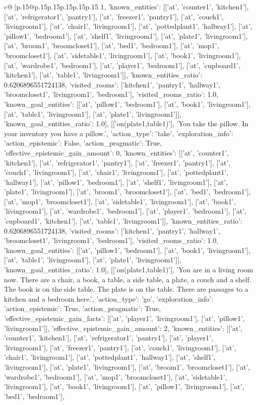 \documentclass{article}
\begin{document}
{\begin{supertabular}{c@{$\;$}|p{.15\linewidth}@{}p{.15\linewidth}p{.15\linewidth}p{.15\linewidth}p{.15\linewidth}p{.15\linewidth}}
{{{1, 'known_entities': [['at', 'counter1', 'kitchen1'], ['at', 'refrigerator1', 'pantry1'], ['at', 'freezer1', 'pantry1'], ['at', 'couch1', 'livingroom1'], ['at', 'chair1', 'livingroom1'], ['at', 'pottedplant1', 'hallway1'], ['at', 'pillow1', 'bedroom1'], ['at', 'shelf1', 'livingroom1'], ['at', 'plate1', 'livingroom1'], ['at', 'broom1', 'broomcloset1'], ['at', 'bed1', 'bedroom1'], ['at', 'mop1', 'broomcloset1'], ['at', 'sidetable1', 'livingroom1'], ['at', 'book1', 'livingroom1'], ['at', 'wardrobe1', 'bedroom1'], ['at', 'player1', 'bedroom1'], ['at', 'cupboard1', 'kitchen1'], ['at', 'table1', 'livingroom1']], 'known_entities_ratio': 0.6206896551724138, 'visited_rooms': ['kitchen1', 'pantry1', 'hallway1', 'broomcloset1', 'livingroom1', 'bedroom1'], 'visited_rooms_ratio': 1.0, 'known_goal_entities': [['at', 'pillow1', 'bedroom1'], ['at', 'book1', 'livingroom1'], ['at', 'table1', 'livingroom1'], ['at', 'plate1', 'livingroom1']], 'known_goal_entities_ratio': 1.0}}], [['on(plate1,table1)'], 'You take the pillow. In your inventory you have a pillow.', {'action_type': 'take', 'exploration_info': {'action_epistemic': False, 'action_pragmatic': True, 'effective_epistemic_gain_amount': 0, 'known_entities': [['at', 'counter1', 'kitchen1'], ['at', 'refrigerator1', 'pantry1'], ['at', 'freezer1', 'pantry1'], ['at', 'couch1', 'livingroom1'], ['at', 'chair1', 'livingroom1'], ['at', 'pottedplant1', 'hallway1'], ['at', 'pillow1', 'bedroom1'], ['at', 'shelf1', 'livingroom1'], ['at', 'plate1', 'livingroom1'], ['at', 'broom1', 'broomcloset1'], ['at', 'bed1', 'bedroom1'], ['at', 'mop1', 'broomcloset1'], ['at', 'sidetable1', 'livingroom1'], ['at', 'book1', 'livingroom1'], ['at', 'wardrobe1', 'bedroom1'], ['at', 'player1', 'bedroom1'], ['at', 'cupboard1', 'kitchen1'], ['at', 'table1', 'livingroom1']], 'known_entities_ratio': 0.6206896551724138, 'visited_rooms': ['kitchen1', 'pantry1', 'hallway1', 'broomcloset1', 'livingroom1', 'bedroom1'], 'visited_rooms_ratio': 1.0, 'known_goal_entities': [['at', 'pillow1', 'bedroom1'], ['at', 'book1', 'livingroom1'], ['at', 'table1', 'livingroom1'], ['at', 'plate1', 'livingroom1']], 'known_goal_entities_ratio': 1.0}}], [['on(plate1,table1)'], 'You are in a living room now. There are a chair, a book, a table, a side table, a plate, a couch and a shelf. The book is on the side table. The plate is on the table. There are passages to a kitchen and a bedroom here.', {'action_type': 'go', 'exploration_info': {'action_epistemic': True, 'action_pragmatic': True, 'effective_epistemic_gain_facts': [['at', 'player1', 'livingroom1'], ['at', 'pillow1', 'livingroom1']], 'effective_epistemic_gain_amount': 2, 'known_entities': [['at', 'counter1', 'kitchen1'], ['at', 'refrigerator1', 'pantry1'], ['at', 'player1', 'livingroom1'], ['at', 'freezer1', 'pantry1'], ['at', 'couch1', 'livingroom1'], ['at', 'chair1', 'livingroom1'], ['at', 'pottedplant1', 'hallway1'], ['at', 'shelf1', 'livingroom1'], ['at', 'plate1', 'livingroom1'], ['at', 'broom1', 'broomcloset1'], ['at', 'wardrobe1', 'bedroom1'], ['at', 'mop1', 'broomcloset1'], ['at', 'sidetable1', 'livingroom1'], ['at', 'book1', 'livingroom1'], ['at', 'pillow1', 'livingroom1'], ['at', 'bed1', 'bedroom1'], }}}
\end{supertabular}}
\end{document}
